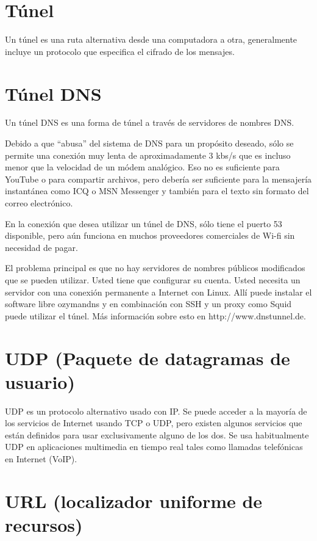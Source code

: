 \documentclass[10pt,a5paper,twoside,,]{book}
\begin{document}
\section{Túnel}\label{tuxfanel}

Un túnel es una ruta alternativa desde una computadora a otra,
generalmente incluye un protocolo que especifica el cifrado de los
mensajes.

\section{Túnel DNS}\label{tuxfanel-dns}

Un túnel DNS es una forma de túnel a través de servidores de nombres
DNS.

Debido a que ``abusa'' del sistema de DNS para un propósito deseado,
sólo se permite una conexión muy lenta de aproximadamente 3 kbs/s que es
incluso menor que la velocidad de un módem analógico. Eso no es
suficiente para YouTube o para compartir archivos, pero debería ser
suficiente para la mensajería instantánea como ICQ o MSN Messenger y
también para el texto sin formato del correo electrónico.

En la conexión que desea utilizar un túnel de DNS, sólo tiene el puerto
53 disponible, pero aún funciona en muchos proveedores comerciales de
Wi-fi sin necesidad de pagar.

El problema principal es que no hay servidores de nombres públicos
modificados que se pueden utilizar. Usted tiene que configurar su
cuenta. Usted necesita un servidor con una conexión permanente a
Internet con Linux. Allí puede instalar el software libre ozymandns y en
combinación con SSH y un proxy como Squid puede utilizar el túnel. Más
información sobre esto en http://www.dnstunnel.de.

\section{UDP (Paquete de datagramas de
usuario)}\label{udp-paquete-de-datagramas-de-usuario}

UDP es un protocolo alternativo usado con IP. Se puede acceder a la
mayoría de los servicios de Internet usando TCP o UDP, pero existen
algunos servicios que están definidos para usar exclusivamente alguno de
los dos. Se usa habitualmente UDP en aplicaciones multimedia en tiempo
real tales como llamadas telefónicas en Internet (VoIP).

\section{URL (localizador uniforme de
recursos)}\label{url-localizador-uniforme-de-recursos}
\end{document}
